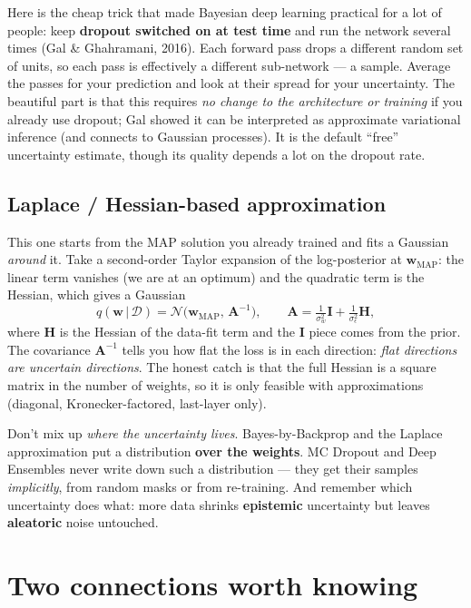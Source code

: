 \documentclass[11pt, oneside]{book}
\newcommand{\eye}{\mathbf{I}}
\newcommand{\dataset}{\mathcal{D}}
\newcommand{\weights}{\mathbf{w}}
\newcommand{\Normal}{\mathcal{N}}
\newcommand{\given}{\,\vert\,}
\begin{document}
Here is the cheap trick that made Bayesian deep learning practical for a lot of
people: keep \textbf{dropout switched on at test time} and run the network several
times (Gal \& Ghahramani, 2016). Each forward pass drops a different random set of
units, so each pass is effectively a different sub-network --- a sample. Average
the passes for your prediction and look at their spread for your uncertainty. The
beautiful part is that this requires \emph{no change to the architecture or
training} if you already use dropout; Gal showed it can be interpreted as
approximate variational inference (and connects to Gaussian processes). It is the
default ``free'' uncertainty estimate, though its quality depends a lot on the
dropout rate.

\subsection{Laplace / Hessian-based approximation}

This one starts from the MAP solution you already trained and fits a Gaussian
\emph{around} it. Take a second-order Taylor expansion of the log-posterior at
$\weights_{\text{MAP}}$: the linear term vanishes (we are at an optimum) and the
quadratic term is the Hessian, which gives a Gaussian
\[
  q(\weights\given\dataset)=\Normal\!\bigl(\weights_{\text{MAP}},\,\mathbf{A}^{-1}\bigr),
  \qquad
  \mathbf{A} = \tfrac{1}{\sigma_w^2}\eye + \tfrac{1}{\sigma_\epsilon^2}\mathbf{H},
\]
where $\mathbf{H}$ is the Hessian of the data-fit term and the $\eye$ piece comes
from the prior. The covariance $\mathbf{A}^{-1}$ tells you how flat the loss is in
each direction: \emph{flat directions are uncertain directions}. The honest catch
is that the full Hessian is a square matrix in the number of weights, so it is
only feasible with approximations (diagonal, Kronecker-factored, last-layer only).

\begin{notebox}[title={Exam trap}]
Don't mix up \emph{where the uncertainty lives}. Bayes-by-Backprop and the Laplace
approximation put a distribution \textbf{over the weights}. MC Dropout and Deep
Ensembles never write down such a distribution --- they get their samples
\emph{implicitly}, from random masks or from re-training. And remember which
uncertainty does what: more data shrinks \textbf{epistemic} uncertainty but leaves
\textbf{aleatoric} noise untouched.
\end{notebox}

\section{Two connections worth knowing}
\end{document}
